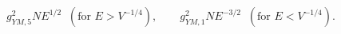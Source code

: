 \begin{equation}
g_{YM,5}^{2}N E^{1/2}\;\;(\mbox{for }E> V^{-1/4}),\qquad
g_{YM,1}^{2}N E^{-3/2}\;\;(\mbox{for }E< V^{-1/4}).
\label{eq:effcoup}
\end{equation}

